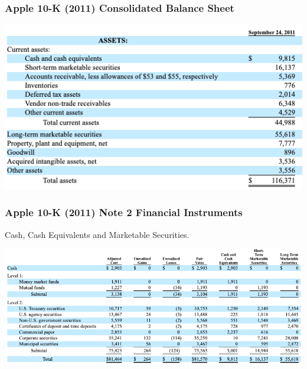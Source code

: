 \documentclass[handout]{beamer}
\begin{document}
\begin{frame}[label=APPL2011]
\frametitle{Apple 10-K (2011) Consolidated Balance Sheet}

\centering
\includegraphics[scale=0.5]{AAPL_2011_bs}
\end{frame}






\begin{frame}
\frametitle{Apple 10-K (2011) Note 2 Financial Instruments}
 Cash, Cash Equivalents and Marketable Securities.

\centering
\includegraphics[scale=0.4]{AAPL_2011_note2}

\hyperlink{duchinapproach}{}
\end{frame}
\end{document}
